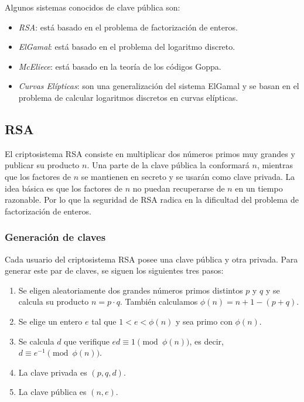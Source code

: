 Algunos sistemas conocidos de clave pública son:

\begin{itemize}
    \item \emph{RSA}: está basado en el problema de factorización de enteros.
    \item \emph{ElGamal}: está basado en el problema del logaritmo discreto.
    \item \emph{McEliece}: está basado en la teoría de los códigos Goppa.
    \item \emph{Curvas Elípticas}: son una generalización del sistema ElGamal y se basan en el problema de calcular logaritmos discretos en curvas elípticas.
\end{itemize}

\subsection{RSA}

El criptosistema RSA consiste en multiplicar dos números primos muy grandes y publicar su producto $n$. Una parte de la clave pública la conformará $n$, mientras que los factores de $n$ se mantienen en secreto y se usarán como clave privada. La idea básica es que los factores de $n$ no puedan recuperarse de $n$ en un tiempo razonable. Por lo que la seguridad de RSA radica en la dificultad del problema de factorización de enteros.

\subsubsection{Generación de claves}

Cada usuario del criptosistema RSA posee una clave pública y otra privada. Para generar este par de claves, se siguen los siguientes tres pasos:

\begin{enumerate}
    \item Se eligen aleatoriamente dos grandes números primos distintos $p$ y $q$ y se calcula su producto $n = p \cdot q$. También calculamos $\phi(n) = n + 1 - (p + q)$.
    \item Se elige un entero $e$ tal que $1 < e < \phi(n)$ y sea primo con $\phi(n)$.
    \item Se calcula $d$ que verifique $ed \equiv 1 \pmod{\phi(n)}$, es decir, $d \equiv e^{-1} \pmod{\phi(n)}$. 
    \item La clave privada es $(p, q, d)$.
    \item La clave pública es $(n, e)$.
\end{enumerate}

